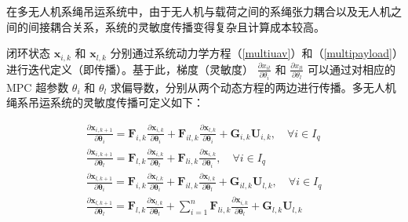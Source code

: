 \documentclass[lang=chs, degree=master, blindreview=true, winfonts=true]{yanputhesis}
\begin{document}

在多无人机系绳吊运系统中，由于无人机与载荷之间的系绳张力耦合以及无人机之间的间接耦合关系，系统的灵敏度传播变得复杂且计算成本较高。

闭环状态 \( \bm x_{i,k} \) 和 \( \bm x_{l,k} \) 分别通过系统动力学方程（\ref{multiuav}）和（\ref{multipayload}）进行迭代定义（即传播）。基于此，梯度（灵敏度） \( \frac{\partial x_{it}}{\partial \theta_i} \) 和 \( \frac{\partial x_{lt}}{\partial \theta_l} \) 可以通过对相应的 MPC 超参数 \( \theta_i \) 和 \( \theta_l \) 求偏导数，分别从两个动态方程的两边进行传播。多无人机绳系吊运系统的灵敏度传播可定义如下：

\begin{equation}
	\begin{gathered}
		\frac{\partial \bm{x}_{i,k+1}}{\partial \bm{\theta}_i} = \bm{F}_{i,k} \frac{\partial \bm{x}_{i,k}}{\partial \bm{\theta}_i} + \bm{F}_{il,k} \frac{\partial \bm{x}_{l,k}}{\partial \bm{\theta}_i} + \bm{G}_{i,k} \bm{U}_{i,k}, \quad \forall i \in I_q 
		\\
		\frac{\partial \bm{x}_{i,k+1}}{\partial \bm{\theta}_l} = \bm{F}_{l,k} \frac{\partial \bm{x}_{i,k}}{\partial \bm{\theta}_l} + \bm{F}_{li,k} \frac{\partial \bm{x}_{i,k}}{\partial \bm{\theta}_i}, \quad \forall i \in I_q
		\\
		\frac{\partial \bm{x}_{l,k+1}}{\partial \bm{\theta}_i} = \bm{F}_{i,k} \frac{\partial \bm{x}_{l,k}}{\partial \bm{\theta}_i} + \bm{F}_{il,k} \frac{\partial \bm{x}_{l,k}}{\partial \bm{\theta}_l} + \bm{G}_{il,k} \bm{U}_{l,k}, \quad \forall i \in I_q
		\\
		\frac{\partial \bm{x}_{l,k+1}}{\partial \bm{\theta}_l} = \bm{F}_{l,k} \frac{\partial \bm{x}_{l,k}}{\partial \bm{\theta}_l} + \sum_{i=1}^{n} \bm{F}_{li,k} \frac{\partial \bm{x}_{i,k}}{\partial \bm{\theta}_l} + \bm{G}_{l,k} \bm{U}_{l,k}
	\end{gathered}
	\label{ss}      
\end{equation}
\end{document}
